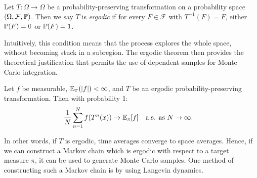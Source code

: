 \begin{defn}[Ergodicity]
Let $T:\Omega \to \Omega$ be a probability-preserving transformation on a probability space $(\Omega,\mathcal{F}, \P)$.  Then we say $T$ is \emph{ergodic} if for every $F \in \mathcal{F}$ with $T^{-1}(F)=F$, either $\P(F)=0$ or $\P(F)=1$.
\end{defn}

Intuitively, this condition means that the process explores the whole space, without becoming stuck in a subregion.  The ergodic theorem then provides the theoretical justification that permits the use of dependent samples for Monte Carlo integration.

\begin{theorem}\label{thm:ergodic}
 Let $f$ be measurable, $\E_\pi(|f|) < \infty$, and $T$ be an ergodic probability-preserving transformation. Then with probability 1:
 $$
\frac{1}{N} \sum_{n=1}^N f(T^n(x)) \to \E_\pi[f] \quad \text{a.s. as $N \to \infty$.}
$$
\end{theorem}
\noindent In other words, if $T$ is ergodic, time averages converge to space averages.  Hence, if we can construct a Markov chain which is ergodic with respect to a target measure $\pi$, it can be used to generate Monte Carlo samples.  One method of constructing such a Markov chain is by using Langevin dynamics.